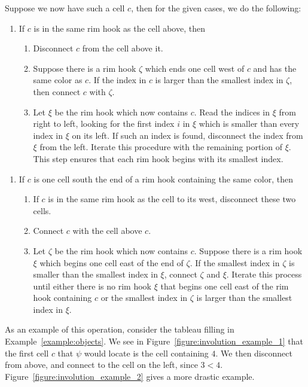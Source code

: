 \documentclass[a4paper,12pt]{amsart}
\theoremstyle{plain}
\theoremstyle{definition}
\theoremstyle{remark}
\begin{document}
Suppose we now have such a cell $c$, then for the given cases, we do the following:
\begin{enumerate}
\item If $c$ is in the same rim hook as the cell above, then
\begin{enumerate}[1.]
\item Disconnect $c$ from the cell above it.
\item Suppose there is a rim hook $\zeta$ which ends one cell west of $c$ and has the same color as $c$.  If the 
index in $c$ is larger than the smallest index in $\zeta$, then connect $c$ with $\zeta$.
\item Let $\xi$ be the rim hook which now contains $c$.  Read the indices in $\xi$ from right to 
left, looking for the first index $i$ in $\xi$ which is smaller than every index in $\xi$ on its left.  
If such  an index is found, disconnect the index from $\xi$ from the left.  
Iterate this procedure with the remaining portion of $\xi$.  This step ensures that each rim hook
begins with its smallest index.
\end{enumerate}
\end{enumerate}

\begin{enumerate}
\item If $c$ is one cell south the end of a rim hook containing the same color, then
\begin{enumerate}[1.]
\item If $c$ is in the same rim hook as the cell to its west, disconnect these two cells.
\item Connect $c$ with the cell above $c$.  
\item Let $\zeta$ be the rim hook which now contains $c$.  Suppose there is a rim hook $\xi$ which 
begins one cell east of the end of $\zeta$.  If the smallest index in $\zeta$ is smaller than the 
smallest index in $\xi$, connect $\zeta$ and $\xi$.   Iterate this process until either there is no
rim hook $\xi$ that begins one cell east of the rim hook containing $c$ or the smallest index 
in $\zeta$ is larger than the smallest index in $\xi$.   
\end{enumerate}
\end{enumerate}

As an example of this operation, consider the tableau filling in Example~\ref{example:objects}. We see in Figure~\ref{figure:involution_example_1} that the first cell $c$ that $\psi$ would locate is the cell containing $4$. We then disconnect from above, and connect to the cell on the left, since $3<4$. Figure~\ref{figure:involution_example_2} gives a more drastic example.
\end{document}
